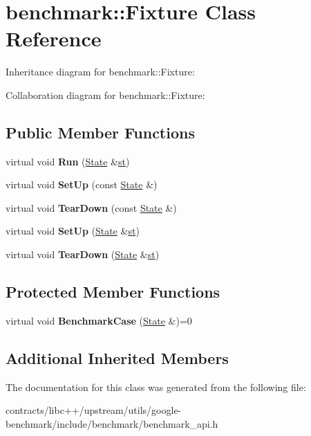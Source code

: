 \hypertarget{classbenchmark_1_1_fixture}{}\section{benchmark\+:\+:Fixture Class Reference}
\label{classbenchmark_1_1_fixture}


Inheritance diagram for benchmark\+:\+:Fixture\+:


Collaboration diagram for benchmark\+:\+:Fixture\+:
\subsection*{Public Member Functions}
\begin{DoxyCompactItemize}
\item 
\mbox{\label{classbenchmark_1_1_fixture_a6bafc34f5a08c0b3026cd0f4b295e438}} 
virtual void {\bfseries Run} (\mbox{\hyperlink{classbenchmark_1_1_state}{State}} \&\mbox{\hyperlink{structst}{st}})
\item 
\mbox{\label{classbenchmark_1_1_fixture_ae2799ffcf5c9f8f629ce46153e168f53}} 
virtual void {\bfseries Set\+Up} (const \mbox{\hyperlink{classbenchmark_1_1_state}{State}} \&)
\item 
\mbox{\label{classbenchmark_1_1_fixture_a9a3e8c37062084ee10471a7daf9769e4}} 
virtual void {\bfseries Tear\+Down} (const \mbox{\hyperlink{classbenchmark_1_1_state}{State}} \&)
\item 
\mbox{\label{classbenchmark_1_1_fixture_ae6bbe93eba0378e47b786fa52c190e4f}} 
virtual void {\bfseries Set\+Up} (\mbox{\hyperlink{classbenchmark_1_1_state}{State}} \&\mbox{\hyperlink{structst}{st}})
\item 
\mbox{\label{classbenchmark_1_1_fixture_ad184b5734da21863d5e8e13df7d2d2cb}} 
virtual void {\bfseries Tear\+Down} (\mbox{\hyperlink{classbenchmark_1_1_state}{State}} \&\mbox{\hyperlink{structst}{st}})
\end{DoxyCompactItemize}
\subsection*{Protected Member Functions}
\begin{DoxyCompactItemize}
\item 
\mbox{\label{classbenchmark_1_1_fixture_a5706028f639cf8b4d9792179ebe9abb7}} 
virtual void {\bfseries Benchmark\+Case} (\mbox{\hyperlink{classbenchmark_1_1_state}{State}} \&)=0
\end{DoxyCompactItemize}
\subsection*{Additional Inherited Members}


The documentation for this class was generated from the following file\+:\begin{DoxyCompactItemize}
\item 
contracts/libc++/upstream/utils/google-\/benchmark/include/benchmark/benchmark\+\_\+api.\+h\end{DoxyCompactItemize}
